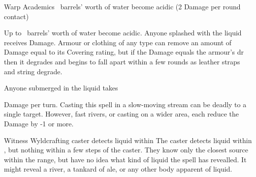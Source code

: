   {\mWater}%
  {Warp}%
  {\duplicated}%
  {Academics}%
  {\spellArea\ barrels' worth of water become acidic (2 Damage per round contact)}%
  {
    Up to \spellArea\ barrels' worth of water become acidic.
    Anyone splashed with the liquid receives  Damage. 
    Armour or clothing of any type can remove an amount of Damage equal to its Covering rating, but if the Damage equals the armour's \gls{dr} then it degrades and begins to fall apart within a few rounds as leather straps and string degrade.

    Anyone submerged in the liquid takes \addtocounter{spelllevel}{2}  Damage per turn.
    Casting this spell in a slow-moving stream can be deadly to a single target.
    However, fast rivers, or casting on a wider area, each reduce the Damage by -1 or more.
  }

  {\mWater}%
  {Witness}%
  {\distant}%
  {Wyldcrafting}%
  {caster detects liquid within \spellRange}%
  {
    The caster detects liquid within \spellRange, but nothing within a few steps of the caster.
    They know only the closest source within the range, but have no idea what kind of liquid the spell has revealled.
    It might reveal a river, a tankard of ale, or any other body apparent of liquid.
  }

